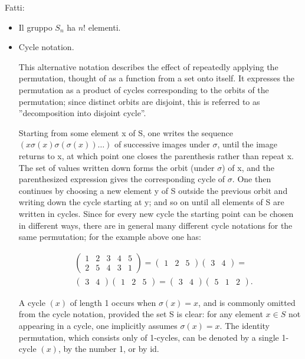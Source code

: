 \documentclass[oneside,12pt]{memoir}
\begin{document}
Fatti:
\begin{itemize}
\item Il gruppo $S_n$ ha $n!$ elementi.
\item Cycle notation.

This alternative notation describes the effect of repeatedly applying the permutation, thought of as a function from a set onto itself. It expresses the permutation as a product of cycles corresponding to the orbits of the permutation; since distinct orbits are disjoint, this is referred to as ''decomposition into disjoint cycle''.

Starting from some element x of S, one writes the sequence $(x \sigma(x) \sigma(\sigma(x)) \ldots)$ of successive images under $\sigma$, until the image returns to x, at which point one closes the parenthesis rather than repeat x. The set of values written down forms the orbit (under $\sigma$) of x, and the parenthesized expression gives the corresponding cycle of $\sigma$. One then continues by choosing a new element y of S outside the previous orbit and writing down the cycle starting at y; and so on until all elements of S are written in cycles. Since for every new cycle the starting point can be chosen in different ways, there are in general many different cycle notations for the same permutation; for the example above one has:

\begin{align*}
&{\begin{pmatrix}1&2&3&4&5\\2&5&4&3&1\end{pmatrix}}={\begin{pmatrix}1&2&5\end{pmatrix}}{\begin{pmatrix}3&4\end{pmatrix}}=\\
&{\begin{pmatrix}3&4\end{pmatrix}}{\begin{pmatrix}1&2&5\end{pmatrix}}={\begin{pmatrix}3&4\end{pmatrix}}{\begin{pmatrix}5&1&2\end{pmatrix}}.
\end{align*}

A cycle $(x)$ of length 1 occurs when $\sigma(x) = x$, and is commonly omitted from the cycle notation, provided the set S is clear: for any element $x \in S$ not appearing in a cycle, one implicitly assumes $\sigma(x) = x$. The identity permutation, which consists only of 1-cycles, can be denoted by a single 1-cycle $(x)$, by the number 1, or by id.


\end{itemize}
\end{document}
